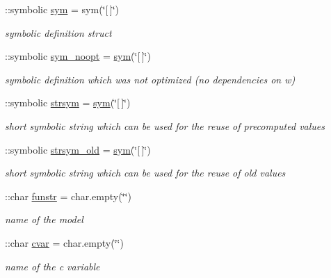 \begin{DoxyCompactItemize}
\item 
\+::symbolic \mbox{\hyperlink{classamifun_a3c48fff3d28406486a4f1b5e18da7ca6}{sym}} = sym(\char`\"{}\mbox{[}$\,$\mbox{]}\char`\"{})
\begin{DoxyCompactList}\small\item\em symbolic definition struct \end{DoxyCompactList}\item 
\+::symbolic \mbox{\hyperlink{classamifun_a653c7ed7ae2eeb18b7cb2f0a6be8ab5b}{sym\+\_\+noopt}} = \mbox{\hyperlink{classamifun_a3c48fff3d28406486a4f1b5e18da7ca6}{sym}}(\char`\"{}\mbox{[}$\,$\mbox{]}\char`\"{})
\begin{DoxyCompactList}\small\item\em symbolic definition which was not optimized (no dependencies on w) \end{DoxyCompactList}\item 
\+::symbolic \mbox{\hyperlink{classamifun_a4814315a739f43461b003c1c1ef6f550}{strsym}} = \mbox{\hyperlink{classamifun_a3c48fff3d28406486a4f1b5e18da7ca6}{sym}}(\char`\"{}\mbox{[}$\,$\mbox{]}\char`\"{})
\begin{DoxyCompactList}\small\item\em short symbolic string which can be used for the reuse of precomputed values \end{DoxyCompactList}\item 
\+::symbolic \mbox{\hyperlink{classamifun_ac42759baa6575c9d39f487be5a2e01a1}{strsym\+\_\+old}} = \mbox{\hyperlink{classamifun_a3c48fff3d28406486a4f1b5e18da7ca6}{sym}}(\char`\"{}\mbox{[}$\,$\mbox{]}\char`\"{})
\begin{DoxyCompactList}\small\item\em short symbolic string which can be used for the reuse of old values \end{DoxyCompactList}\item 
\+::char \mbox{\hyperlink{classamifun_a484b54379bc8b29b6ce65d84966ea4c4}{funstr}} = char.\+empty(\char`\"{}\char`\"{})
\begin{DoxyCompactList}\small\item\em name of the model \end{DoxyCompactList}\item 
\+::char \mbox{\hyperlink{classamifun_a716c1ceb8235bc1005b606f777530ede}{cvar}} = char.\+empty(\char`\"{}\char`\"{})
\begin{DoxyCompactList}\small\item\em name of the c variable \end{DoxyCompactList}\item 

\end{DoxyCompactItemize}
